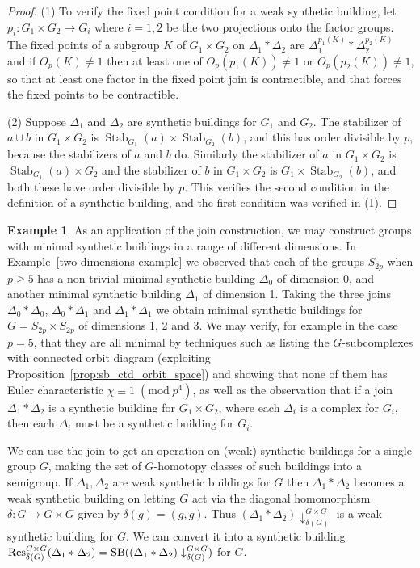 \documentclass[12pt]{amsart}
\theoremstyle{plain}
\theoremstyle{definition}
\newtheorem{example}[theorem]{Example}
\theoremstyle{remark}
\numberwithin{equation}{section}
\DeclareMathOperator \Res{\mathop{\rm Res}\nolimits}
\DeclareMathOperator \SB{\mathop{\rm SB}\nolimits}
\DeclareMathOperator{\Stab}{Stab}
\begin{document}
\begin{proof}
    (1) To verify the fixed point condition for a weak synthetic building, let $p_i:G_1\times G_2\to G_i$ where $i=1,2$ be the two projections onto the factor groups. The fixed points of a subgroup $K$ of $G_1\times G_2$ on $\Delta_1*\Delta_2$ are $\Delta_1^{p_1(K)}*\Delta_2^{p_2(K)}$ and if $O_p(K)\ne 1$ then at least one of $O_p(p_1(K))\ne 1$ or $O_p(p_2(K))\ne 1$, so that at least one factor in the fixed point join is contractible, and that forces the fixed points to be contractible.
    
    (2) Suppose $\Delta_1$ and $\Delta_2$ are synthetic buildings for $G_1$ and $G_2$. The stabilizer of $a\cup b$ in $G_1\times G_2$ is $\Stab_{G_1}(a)\times \Stab_{G_2}(b)$, and this has order divisible by $p$, because the stabilizers of $a$ and $b$ do. Similarly the stabilizer of $a$ in $G_1\times G_2$ is $\Stab_{G_1}(a)\times G_2$ and the stabilizer of $b$ in $G_1\times G_2$ is $G_1\times \Stab_{G_2}(b)$, and both these have order divisible by $p$. This verifies the second condition in the definition of a synthetic building, and the first condition was verified in (1). 

\end{proof}
\begin{example}
    As an application of the join construction, we may construct groups with minimal synthetic buildings in a range of different dimensions. In Example~\ref{two-dimensions-example} we observed that each of the groups $S_{2p}$ when $p\ge 5$ has a non-trivial minimal synthetic building $\Delta_0$ of dimension 0, and another minimal synthetic building $\Delta_1$ of dimension 1. Taking the three joins $\Delta_0*\Delta_0$, $\Delta_0*\Delta_1$ and $\Delta_1*\Delta_1$ we obtain minimal synthetic buildings for $G=S_{2p}\times S_{2p}$ of dimensions 1, 2 and 3. We may verify, for example in the case $p=5$, that they are all minimal by techniques such as listing the $G$-subcomplexes with connected orbit diagram (exploiting Proposition~\ref{prop:sb_ctd_orbit_space}) and showing that none of them has Euler characteristic $\chi \equiv 1 \;(\textrm{mod}\; p^4)$, as well as the observation that if a join $\Delta_1*\Delta_2$ is a synthetic building for $G_1\times G_2$, where each $\Delta_i$ is a complex for $G_i$, then each $\Delta_i$ must be a synthetic building for $G_i$.
\end{example}

We can use the join to get an operation on (weak) synthetic buildings for a single group $G$, making the set of $G$-homotopy classes of such buildings into a semigroup. If $\Delta_1,\Delta_2$ are weak synthetic buildings for $G$ then $\Delta_1*\Delta_2$ becomes a weak synthetic building on letting $G$ act via the diagonal homomorphism $\delta:G\to G\times G$ given by $\delta(g)=(g,g)$. Thus $(\Delta_1*\Delta_2)\downarrow_{\delta(G)}^{G\times G}$ is a weak synthetic building for $G$. We can convert it into a synthetic building $\Res_{\delta(G)}^{G\times G}(\Delta_1*\Delta_2)=\SB((\Delta_1*\Delta_2)\downarrow_{\delta(G)}^{G\times G})$ for $G$. 
\end{document}
